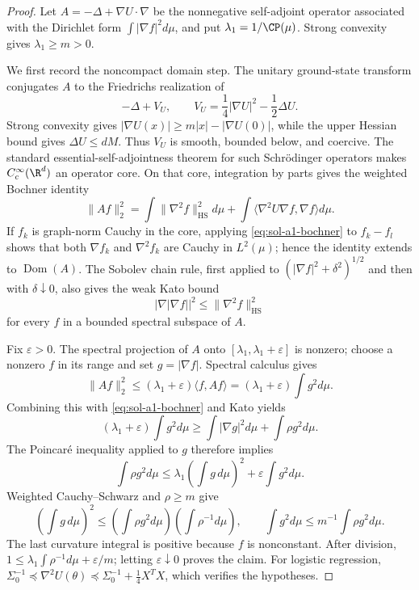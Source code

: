 \documentclass[../main.tex]{subfiles}
\begin{document}
\begin{proof}
Let $A=-\Delta+\nabla U\cdot\nabla$ be the nonnegative self-adjoint operator associated with the
Dirichlet form $\int|\nabla f|^2d\mu$, and put
$\lambda_1=1/\CP(\mu)$.  Strong convexity gives $\lambda_1\ge m>0$.

We first record the noncompact domain step.  The unitary ground-state transform conjugates $A$ to
the Friedrichs realization of
\[
 -\Delta+V_U,\qquad
 V_U=\frac14|\nabla U|^2-\frac12\Delta U.
\]
Strong convexity gives $|\nabla U(x)|\ge m|x|-|\nabla U(0)|$, while the upper Hessian bound gives
$\Delta U\le dM$.  Thus $V_U$ is smooth, bounded below, and coercive.  The standard
essential-self-adjointness theorem for such Schr\"odinger operators makes $C_c^\infty(\R^d)$ an
operator core.  On that core, integration by parts gives the weighted Bochner identity
\begin{equation}\label{eq:sol-a1-bochner}
 \|Af\|_2^2
 =\int\|\nabla^2f\|_{\mathrm{HS}}^2d\mu
  +\int\langle\nabla^2U\nabla f,\nabla f\rangle d\mu.
\end{equation}
If $f_k$ is graph-norm Cauchy in the core, applying \eqref{eq:sol-a1-bochner} to
$f_k-f_l$ shows that both $\nabla f_k$ and $\nabla^2f_k$ are Cauchy in $L^2(\mu)$; hence the
identity extends to $\operatorname{Dom}(A)$.  The Sobolev chain rule, first applied to
$(|\nabla f|^2+\delta^2)^{1/2}$ and then with $\delta\downarrow0$, also gives the weak Kato bound
\[
  |\nabla|\nabla f||^2\le\|\nabla^2f\|_{\mathrm{HS}}^2
\]
for every $f$ in a bounded spectral subspace of $A$.

Fix $\varepsilon>0$.  The spectral projection of $A$ onto
$[\lambda_1,\lambda_1+\varepsilon]$ is nonzero; choose a nonzero $f$ in its range and set
$g=|\nabla f|$.  Spectral calculus gives
\[
 \|Af\|_2^2\le(\lambda_1+\varepsilon)\langle f,Af\rangle
 = (\lambda_1+\varepsilon)\int g^2d\mu.
\]
Combining this with \eqref{eq:sol-a1-bochner} and Kato yields
\[
 (\lambda_1+\varepsilon)\int g^2d\mu
 \ge\int|\nabla g|^2d\mu+\int\rho g^2d\mu.
\]
The Poincar\'e inequality applied to $g$ therefore implies
\[
 \int\rho g^2d\mu
 \le\lambda_1\left(\int g\,d\mu\right)^2
   +\varepsilon\int g^2d\mu.
\]
Weighted Cauchy--Schwarz and $\rho\ge m$ give
\[
 \left(\int g\,d\mu\right)^2
 \le\left(\int\rho g^2d\mu\right)\left(\int\rho^{-1}d\mu\right),
 \qquad
 \int g^2d\mu\le m^{-1}\int\rho g^2d\mu.
\]
The last curvature integral is positive because $f$ is nonconstant.  After division,
$1\le\lambda_1\int\rho^{-1}d\mu+\varepsilon/m$; letting $\varepsilon\downarrow0$ proves the
claim.  For logistic regression,
$\Sigma_0^{-1}\preceq\nabla^2U(\theta)
\preceq\Sigma_0^{-1}+\frac14X^TX$, which verifies the hypotheses.
\end{proof}
\end{document}
